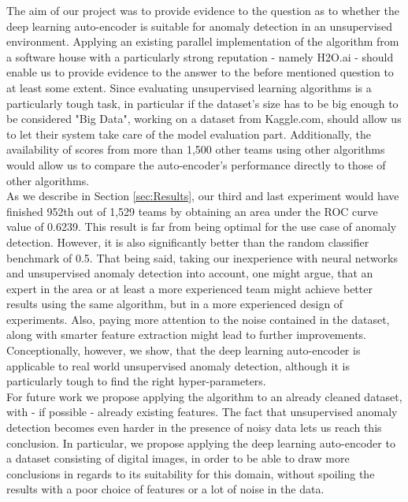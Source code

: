 \documentclass{vldb}
\begin{document}
The aim of our project was to provide evidence to the question as to whether the deep learning auto-encoder is suitable for anomaly detection in an unsupervised environment. Applying an existing parallel implementation of the algorithm from a software house with a particularly strong reputation - namely H2O.ai - should enable us to provide evidence to the answer to the before mentioned question to at least some extent. Since evaluating unsupervised learning algorithms is a particularly tough task, in particular if the dataset's size has to be big enough to be considered "Big Data", working on a dataset from Kaggle.com, should allow us to let their system take care of the model evaluation part. Additionally, the availability of scores from more than 1,500 other teams using other algorithms would allow us to compare the auto-encoder's performance directly to those of other algorithms.\\
As we describe in Section \ref{sec:Results}, our third and last experiment would have finished 952th out of 1,529 teams by obtaining an area under the ROC curve value of 0.6239. This result is far from being optimal for the use case of anomaly detection. However, it is also significantly better than the random classifier benchmark of 0.5. That being said, taking our inexperience with neural networks and unsupervised anomaly detection into account, one might argue, that an expert in the area or at least a more experienced team might achieve better results using the same algorithm, but in a more experienced design of experiments. Also, paying more attention to the noise contained in the dataset, along with smarter feature extraction might lead to further improvements. Conceptionally, however, we show, that the deep learning auto-encoder is applicable to real world unsupervised anomaly detection, although it is particularly tough to find the right hyper-parameters. \\
For future work we propose applying the algorithm to an already cleaned dataset, with - if possible - already existing features. The fact that unsupervised anomaly detection becomes even harder in the presence of noisy data lets us reach this conclusion. In particular, we propose applying the deep learning auto-encoder to a dataset consisting of digital images, in order to be able to draw more conclusions in regards to its suitability for this domain, without spoiling the results with a poor choice of features or a lot of noise in the data.


\end{document}
